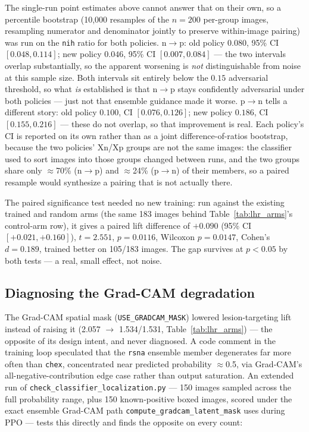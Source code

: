 \documentclass[11pt]{article}
\begin{document}
The single-run point estimates above cannot answer that on their own, so a
percentile bootstrap (10,000 resamples of the $n=200$ per-group images,
resampling numerator and denominator jointly to preserve within-image
pairing) was run on the \texttt{nih} ratio for both policies. n$\to$p: old
policy $0.080$, 95\% CI $[0.048, 0.114]$; new policy $0.046$, 95\% CI
$[0.007, 0.084]$ — the two intervals overlap substantially, so the apparent
worsening is \emph{not} distinguishable from noise at this sample size.
Both intervals sit entirely below the $0.15$ adversarial threshold, so what
\emph{is} established is that n$\to$p stays confidently adversarial under
both policies — just not that ensemble guidance made it worse. p$\to$n
tells a different story: old policy $0.100$, CI $[0.076, 0.126]$; new
policy $0.186$, CI $[0.155, 0.216]$ — these do not overlap, so that
improvement is real. Each policy's CI is reported on its own rather than as
a joint difference-of-ratios bootstrap, because the two policies' Xn/Xp
groups are not the same images: the classifier used to sort images into
those groups changed between runs, and the two groups share only
$\approx$70\% (n$\to$p) and $\approx$24\% (p$\to$n) of their members, so a
paired resample would synthesize a pairing that is not actually there.

The paired significance test needed no new training: run against the
existing trained and random arms (the same 183 images behind
Table~\ref{tab:lhr_arms}'s control-arm row), it gives a paired lift
difference of $+0.090$ (95\% CI $[+0.021, +0.160]$), $t=2.551$,
$p=0.0116$, Wilcoxon $p=0.0147$, Cohen's $d=0.189$, trained better on
105/183 images. The gap survives at $p<0.05$ by both tests — a real,
small effect, not noise.

\subsection{Diagnosing the Grad-CAM degradation}
\label{sec:gradcam_diagnosis}

The Grad-CAM spatial mask (\texttt{USE\_GRADCAM\_MASK}) lowered
lesion-targeting lift instead of raising it (2.057 $\to$ 1.534/1.531,
Table~\ref{tab:lhr_arms}) — the opposite of its design intent, and never
diagnosed. A code comment in the training loop speculated that the
\texttt{rsna} ensemble member degenerates far more often than
\texttt{chex}, concentrated near predicted probability $\approx$0.5, via
Grad-CAM's all-negative-contribution edge case rather than output
saturation. An extended run of \texttt{check\_classifier\_localization.py}
— 150 images sampled across the full probability range, plus 150
known-positive boxed images, scored under the exact ensemble Grad-CAM path
\texttt{compute\_gradcam\_latent\_mask} uses during PPO — tests this
directly and finds the opposite on every count:
\end{document}

